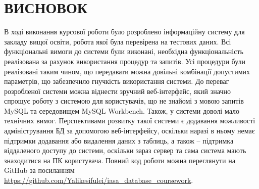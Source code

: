 \newpage
\chapter{ВИСНОВОК}
В ході виконання курсової роботи було розроблено інформаційну систему для закладу
вищої освіти, робота якої була перевірена на тестових даних.
Всі функціональні вимоги до системи були виконані, необхідна функціональність реалізована за рахунок 
використання процедур та запитів.
Усі процедури були реалізовані таким чином, що передавати можна довільні комбінації
допустимих параметрів, що забезпечило гнучкість використання системи.
До переваг розробленої системи можна віднести зручний веб-інтерфейс, який значно спрощує
роботу з системою для користувачів, що не знайомі з мовою запитів MySQL та середовищем
MySQL Workbench. Також, у системи доволі мало технічних вимог.
Перспективами розвитку такої системи є додавання можливості адміністрування БД за допомогою
веб-інтерфейсу, оскільки наразі в ньому немає підтримки додавання або видалення даних з таблиць,
а також -- підтримка віддаленого доступу до системи, оскільки зараз сервер та сама система
мають знаходитися на ПК користувача.
Повний код роботи можна переглянути на GitHub за посиланням
{\small \url{https://github.com/Yalikesifulei/iasa_database_coursework}}.